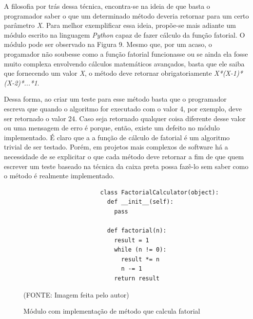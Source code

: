 \documentclass[
    12pt,       %
    openright,      %
    twoside,      %
    a4paper,      %
    english,      %
    french,       %
    spanish,      %
    brazil,       %
    ]{abntex2}
\begin{document}
              A filosofia por trás dessa técnica, encontra-se na ideia de que basta o programador
              saber o que um determinado método deveria retornar para um certo parâmetro
              \textit{X}. Para melhor exemplificar essa ideia, propõe-se mais adiante um módulo
              escrito na linguagem \textit{Python} capaz de fazer cálculo da função fatorial.
              O módulo pode ser observado na Figura 9. Mesmo que, por um
              acaso, o progamador não soubesse como a função fatorial funcionasse ou se ainda ela
              fosse muito complexa envolvendo cálculos matemáticos avançados, basta que ele saiba que
              fornecendo um valor \textit{X}, o método deve retornar obrigatoriamente
              \textit{X*(X-1)*(X-2)*...*1}.

              Dessa forma, ao criar um teste para esse método basta que o programador escreva que
              quando o algoritmo for executado com o valor 4, por exemplo, deve ser retornado
              o valor 24. Caso seja retornado qualquer coisa diferente desse valor ou uma mensagem
              de erro é porque, então, existe um defeito no módulo implementado. É claro que a
              a função de cálculo de fatorial é um algoritmo trivial de ser testado. Porém, em
              projetos mais complexos de software há a necessidade de se explicitar o que cada
              método deve retornar a fim de que quem escrever um teste baseado na técnica da caixa
              preta possa fazê-lo sem saber como o método é realmente implementado.

              \begin{figure}[!htbp]
                  \begin{lstlisting}
                      class FactorialCalculator(object):
                        def __init__(self):
                          pass

                        def factorial(n):
                          result = 1
                          while (n != 0):
                            result *= n
                            n -= 1
                          return result

                  \end{lstlisting}
                  \caption{\label{fig:passaro}Módulo com implementação de método que calcula fatorial}
                  \begin{center}(FONTE: Imagem feita pelo autor)\end{center}
              \end{figure}
\end{document}
